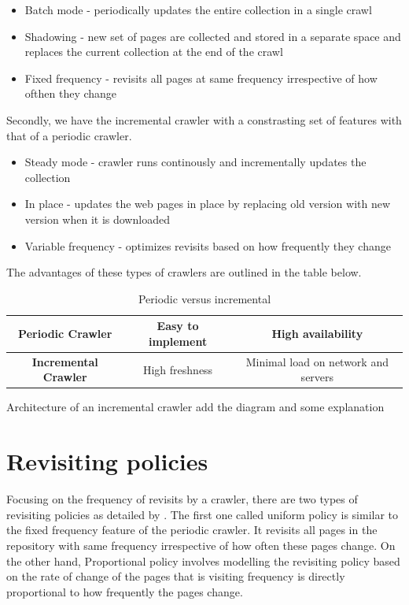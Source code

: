 \documentclass[a4paper, 11pt]{article} %
\begin{document}
\begin{itemize}
\item Batch mode - periodically updates the entire collection in a single crawl
\item Shadowing - new set of pages are collected and stored in a separate space and replaces the current collection at the end of the crawl
\item Fixed frequency - revisits all pages at same frequency irrespective of how ofthen they change
\end{itemize} 

Secondly, we have the incremental crawler with a constrasting set of features with that of a periodic crawler.

\begin{itemize}

\item Steady mode - crawler runs continously and incrementally updates the collection
\item In place - updates the web pages in place by replacing old version with new version when it is downloaded
\item Variable frequency - optimizes revisits based on how frequently they change 

\end{itemize}

The advantages of these types of crawlers are outlined in the table below.

\begin{table}[h]
\begin{tabular}{|c|c|c|}
\hline 
\textbf{Periodic Crawler} & Easy to implement & High availability \\ 
\hline 
\textbf{Incremental Crawler }& High freshness & Minimal load on network and servers \\ 
\hline
\end{tabular} 
\caption{Periodic versus incremental} 
\end{table}

Architecture of an incremental crawler add the diagram and some explanation

\section{Revisiting policies}

Focusing on the frequency of revisits by a crawler, there are two types of revisiting policies as detailed by \cite{cho2003effective}. The first one called uniform policy is similar to the fixed frequency feature of the periodic crawler. It revisits all pages in the repository with same frequency irrespective of how often these pages change. On the other hand, Proportional policy involves modelling the revisiting policy based on the rate of change of the pages that is visiting frequency is directly proportional to how frequently the pages change. \\
\end{document}
